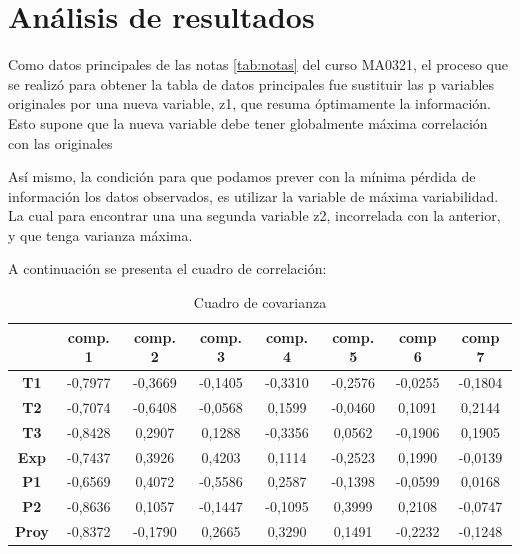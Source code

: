 \chapter{Análisis de resultados}
\label{ch: Análisis de resultado}

Como datos principales de las notas \ref{tab:notas} del curso MA0321, el proceso que se realizó para obtener la tabla de datos principales fue sustituir las p variables originales por una nueva variable, z1, que resuma óptimamente la información. Esto supone que la nueva variable debe tener globalmente máxima correlación con las originales

Así mismo, la condición para que podamos prever con la mínima pérdida de información los datos observados, es utilizar la variable de máxima variabilidad. La cual para encontrar una una segunda variable z2, incorrelada con la anterior, y que tenga varianza máxima.\cite{CastilloGonzalez}

A continuación se presenta el cuadro de correlación:

\begin{table}[H]
\centering
\begin{tabular}{|c|c|c|c|c|c|c|c|}
\hline
\textbf{}     & \textbf{comp. 1} & \textbf{comp. 2} & \textbf{comp. 3} & \textbf{comp. 4} & \textbf{comp. 5} & \textbf{comp 6} & \textbf{comp 7} \\ \hline
\textbf{T1}   & -0,7977    & -0,3669    & -0,1405    & -0,3310    & -0,2576    & -0,0255     & -0,1804   \\ \hline
\textbf{T2}   & -0,7074    & -0,6408    & -0,0568      & 0,1599     & -0,0460     & 0,1091     & 0,2144     \\ \hline
\textbf{T3}   & -0,8428    & 0,2907     & 0,1288      & -0,3356    & 0,0562     & -0,1906    & 0,1905     \\ \hline
\textbf{Exp}  & -0,7437    & 0,3926     & 0,4203     & 0,1114     & -0,2523    & 0,1990     & -0,0139    \\ \hline
\textbf{P1}   & -0,6569      & 0,4072     & -0,5586    & 0,2587     & -0,1398    & -0,0599    & 0,0168     \\ \hline
\textbf{P2}   & -0,8636    & 0,1057     & -0,1447     & -0,1095    & 0,3999     & 0,2108     & -0,0747    \\ \hline
\textbf{Proy} & -0,8372    & -0,1790    & 0,2665     & 0,3290     & 0,1491     & -0,2232    & -0,1248     \\ \hline
\end{tabular}
\caption{Cuadro de covarianza}
    \label{tab:Cuadro de covarianza}
\end{table}


